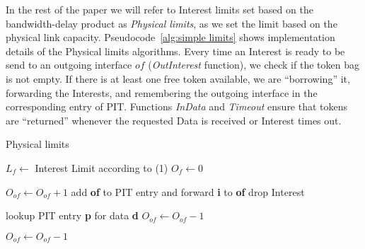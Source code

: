In the rest of the paper we will refer to Interest limits set based on the bandwidth-delay product as \emph{Physical limits}, as we set the limit based on the physical link capacity.
Pseudocode~\ref{alg:simple limits} shows implementation details of the Physical limits algorithms.
Every time an Interest is ready to be send to an outgoing interface $of$ (\emph{OutInterest} function), we check if the token bag is not empty.
If there is at least one free token available, we are ``borrowing'' it, forwarding the Interests, and remembering the outgoing interface in the corresponding entry of PIT.
Functions \emph{InData} and \emph{Timeout} ensure that tokens are ``returned'' whenever the requested Data is received or Interest times out.


\begin{algorithm}[h]
\caption{Physical limits}
\label{alg:simple limits}
\begin{algorithmic}[1]
    \State $L_{f} \leftarrow$ Interest Limit according to (1)
    \State $O_{f} \leftarrow 0$ 
\EndFor

\vspace{0.2cm}
     
        \State $O_{of} \leftarrow O_{of} + 1$  
        \State add \textbf{of} to PIT entry and forward \textbf{i} to \textbf{of}
    \Else
        \State drop Interest
    \EndIf
\EndFunction

\vspace{0.2cm}

   \State lookup PIT entry \textbf{p} for data \textbf{d}
        \State $O_{of} \leftarrow O_{of} - 1$ 
   \EndFor
\EndFunction

\vspace{0.2cm}

        \State $O_{of} \leftarrow O_{of} - 1$ 
   \EndFor
\EndFunction

\end{algorithmic}
\end{algorithm}


